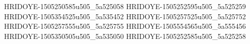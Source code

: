 HRIDOYE-1505250585u505_5a525058
HRIDOYE-1505252595u505_5a525259
HRIDOYE-1505354525u505_5a535452
HRIDOYE-1505257525u505_5a525752
HRIDOYE-1505257555u505_5a525755
HRIDOYE-1505554565u505_5a555456
HRIDOYE-1505350505u505_5a535050
HRIDOYE-1505252585u505_5a525258
